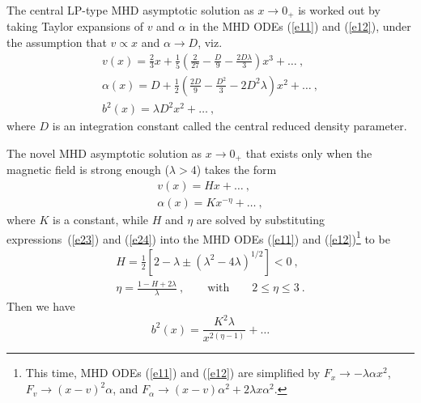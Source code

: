 \documentclass[fleqn,usenatbib]{mnras}
\begin{document}
The central LP-type MHD asymptotic solution as $x\rightarrow 0_{+}$ is worked out by taking Taylor expansions of $v$ and $\alpha$ in the MHD ODEs (\ref{e11}) and (\ref{e12}), under the assumption that $v\propto x$ and $\alpha\rightarrow D$, viz.
\begin{gather}
v(x)= \frac{2}{3}x+\frac{1}{5}\left(\frac{2}{27}
 -\frac{D}{9}-\frac{2D\lambda}{3}\right)x^{3}+\ldots\ ,\\
\alpha(x)=D+\frac{1}{2}\left(\frac{2D}{9}-\frac{D^{2}}{3}
 -2D^{2}\lambda\right)x^{2}+\ldots\ ,\\
b^{2}(x)=\lambda D^{2}x^{2}+\ldots\ ,
\end{gather}
where $D$ is an integration constant called the central reduced density parameter.


The novel MHD asymptotic solution as $x\rightarrow 0_{+}$ that exists only when the magnetic field is strong enough ($\lambda>4$) takes the form \citep{yuLou2006}
\begin{gather}
v(x)=Hx+\ldots\ ,\label{e23}\\
\alpha(x)=Kx^{-\eta}+\ldots\ ,\label{e24}
\end{gather}
where $K$ is a constant, while $H$ and $\eta$ are solved by substituting expressions~(\ref{e23}) and (\ref{e24}) into the MHD ODEs (\ref{e11}) and (\ref{e12})\footnote{This time, MHD ODEs (\ref{e11}) and (\ref{e12}) are simplified by $F_{x}\rightarrow -\lambda\alpha x^{2}$, $F_{v}\rightarrow \left( x-v\right)^{2}\alpha $, and $F_{\alpha}\rightarrow (x-v)\alpha^{2}+2\lambda x\alpha^{2}$.} to be
\begin{gather}
H=\frac{1}{2}\left[2-\lambda\pm
 \left(\lambda^{2}-4\lambda\right)^{1/2}\right]<0\ ,\label{e25}\\
 \eta=\frac{1-H+2\lambda}{\lambda}\ ,
 \qquad \text{with} \qquad 2\leq\eta\leq 3\ . \label{e26}
\end{gather}
Then we have
\begin{equation}
b^{2}(x)=\frac{K^{2}\lambda}{x^{2(\eta-1)}}+\ldots
\end{equation}
\end{document}
